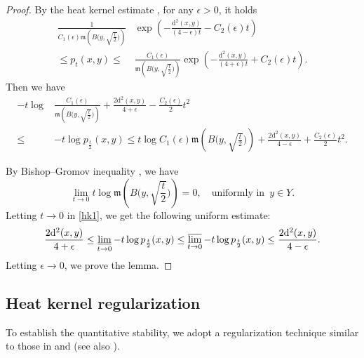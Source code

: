 \documentclass[a4paper,11pt]{article}
\numberwithin{equation}{section}
\theoremstyle{plain}
\theoremstyle{definition}
\theoremstyle{remark}
\newcommand{\mm}{\mathfrak m}
\renewcommand{\d}{{\mathrm d}}
\newcommand{\limi}{\varliminf}
\newcommand{\lims}{\varlimsup}
\begin{document}
	\begin{proof}
		By the heat kernel estimate  \cite[Theorem 1.2] {zbMATH06580546}, for any $\epsilon>0$,  it holds
		\begin{equation}\label{hk0}
			\begin{aligned}
				\frac{1}{C_1(\epsilon)\mm\left(B\big(y, \sqrt{\frac{t}{2}}\big)\right)} &\exp\left(-\frac{\d^2(x, y)}{(4 - \epsilon)t}-C_2(\epsilon)t\right) \\
				\leq p_t(x, y)
				 \leq &
				\frac{C_1(\epsilon)}{\mm\left(B\big(y, \sqrt{\frac{t}{2}}\big)\right)} \exp\left(-\frac{\d^2(x, y)}{(4 + \epsilon)t}+C_2(\epsilon)t\right).
			\end{aligned}
		\end{equation}
		Then we have 
		\begin{equation}\label{hk1}
			\begin{aligned}
				-t\log &\frac{C_1(\epsilon)}{\mm\left(B\big(y, \sqrt{\frac{t}{2}}\big)\right)}+\frac{2\d^2(x, y)}{4+\epsilon}-\frac{C_2(\epsilon)}{2}t^2\\
				\leq &-t \log p_\frac{t}{2}(x,y)
				\leq  t\log C_1(\epsilon)\mm\left(B\big(y, \sqrt{\frac{t}{2}}\big)\right)+\frac{2\d^2(x, y)}{4-\epsilon}+\frac{C_2(\epsilon)}{2}t^2.
			\end{aligned}
		\end{equation}
		
		By Bishop--Gromov inequality \cite[Theorem 2.3]{zbMATH05049052}, we have
		\begin{equation}
		\lim_{t\rightarrow0}t\log \mm\left(B\big(y, \sqrt{\frac{t}{2}}\big)\right)=0,\quad \text{uniformly in } \, y\in Y.
		\end{equation}
Letting $t\rightarrow0$   in \eqref{hk1}, we get the following uniform estimate:
		\begin{equation}
			\frac{2\d^2(x, y)}{4+\epsilon}\leq   \limi_{t\rightarrow0}-t \log p_\frac{t}{2}(x,y)\leq \lims_{t\rightarrow0}-t \log p_\frac{t}{2}(x,y)\leq\frac{2\d^2(x, y)}{4-\epsilon}.
		\end{equation}
		Letting   $\epsilon\rightarrow0$, we prove the lemma.
	\end{proof}
	
	\subsection{Heat kernel regularization}\label{sub}
	To establish the quantitative stability, we adopt a regularization technique similar to those in \cite{MerigotDelalandeChazal2020, arXiv:2504.05412} and \cite{GTJEMS, GTT25} (see also  \cite{ChizatDelalandeVaskevicius2024,CorderoErausquinKlartag2015,MischlerTrevisan2025}). 
 
\end{document}
